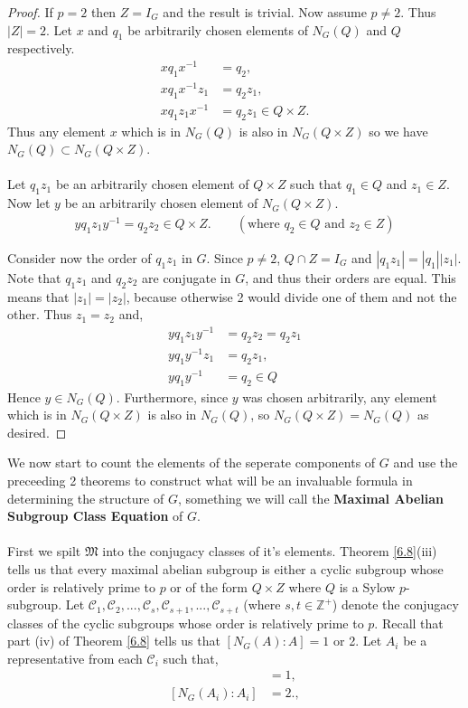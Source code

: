 \documentclass[a4paper , 11pt]{book}
\theoremstyle{definition}
\theoremstyle{remark}
\begin{document}
\begin{proof} 

If $p= 2$ then $Z = I_G$ and the result is trivial. Now assume $p \neq 2$. Thus $|Z| = 2$. Let $x$ and $q_1$ be arbitrarily chosen elements of $N_G(Q)$ and $Q$ respectively.
\begin{align*} xq_1x^{-1} &= q_2, \tag{for some $q_2 \in Q$}
\\ xq_1x^{-1}z_1 &= q_2z_1,
\\ xq_1z_1x^{-1} &= q_2z_1 \in Q \times Z.
\end{align*}
Thus any element $x$ which is in $N_G(Q)$ is also in $N_G(Q \times Z)$ so we have $N_G(Q) \subset N_G(Q \times Z)$. \\
\\
Let $q_1 z_1$ be an arbitrarily chosen element of $Q \times Z$ such that $q_1 \in Q$ and $z_1 \in Z$. Now let $y$ be an arbitrarily chosen element of $N_G(Q \times Z)$.
\begin{align*} y q_1 z_1 y^{-1} = q_2 z_2 \in Q \times Z. \qquad (\text{where $q_2 \in Q$ and $z_2 \in Z$}) 
\end{align*}

Consider now the order of $q_1z_1$ in $G$. Since $p \neq 2$, $Q \cap Z = I_G$ and $|q_1 z_1| = |q_1| |z_1|$. Note that $q_1 z_1$ and $q_2 z_2$ are conjugate in $G$, and thus their orders are equal. This means that $|z_1| = |z_2|$, because otherwise 2 would divide one of them and not the other. Thus $z_1 = z_2$ and,
\begin{align*} y q_1z_1 y^{-1} &=  q_2z_2 = q_2z_1
\\ y q_1 y^{-1} z_1 &= q_2z_1,
\\ y q_1 y^{-1} &= q_2 \in Q
\end{align*}
Hence $y \in N_G(Q)$. Furthermore, since $y$ was chosen arbitrarily, any element which is in $N_G(Q \times Z)$ is also in $N_G(Q)$, so $N_G(Q \times Z) = N_G(Q)$ as desired.

\end{proof}

We now start to count the elements of the seperate components of $G$ and use the preceeding 2 theorems to construct what will be an invaluable formula in determining the structure of $G$, something we will call the \textbf{Maximal Abelian Subgroup Class Equation} of $G$. \\
\\
First we spilt $\mathfrak{M}$ into the conjugacy classes of it's elements. Theorem \ref{6.8}(iii) tells us that every maximal abelian subgroup is either a cyclic subgroup whose order is relatively prime to $p$ or of the form $Q \times Z$ where $Q$ is a Sylow $p$-subgroup. Let $\mathcal{C}_1, \mathcal{C}_2,...,\mathcal{C}_s, \mathcal{C}_{s+1},..., \mathcal{C}_{s+t}$ (where $s, t \in \mathbb{Z}^+$) denote the conjugacy classes of the cyclic subgroups whose order is relatively prime to $p$. Recall that part (iv) of Theorem \ref{6.8} tells us that $[N_G(A): A] = 1$ or 2. Let $A_i$ be a representative from each $\mathcal{C}_i$ such that,
\begin{align*} [N_G(A_i) : A_i] &= 1, \tag{for  $i \leq s$} \\[2mm]
[N_G(A_i) : A_i] &= 2. \tag{for  $s < i \leq s+t$}, \end{align*}
\end{document}
